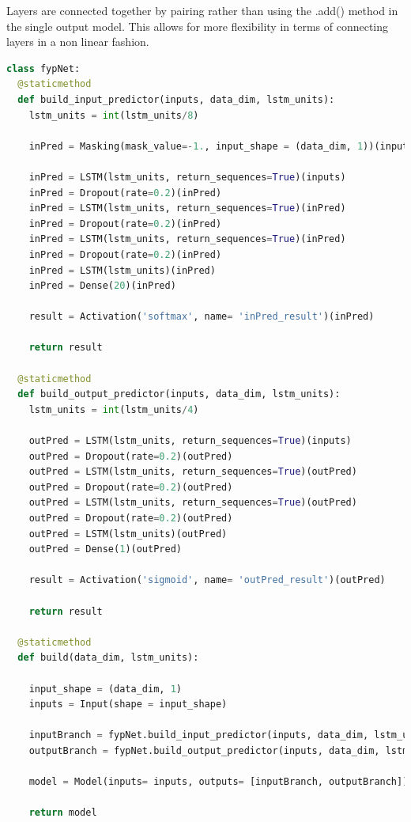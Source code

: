 \documentclass[10pt,onecolumn,letterpaper]{article}
\begin{document}
Layers are connected together by pairing rather than using the .add() method in the single output model. This allows for more flexibility in terms of connecting layers in a non linear fashion.   

\begin{lstlisting}[language=Python, breaklines=true, caption={Structuring of the multi output model, with two branches focused on the separate tasks of predicting the target variable, $y$ and the next input vector, $x_{t+1}$.}]
class fypNet: 
  @staticmethod
  def build_input_predictor(inputs, data_dim, lstm_units):
    lstm_units = int(lstm_units/8)

    inPred = Masking(mask_value=-1., input_shape = (data_dim, 1))(inputs)
    
    inPred = LSTM(lstm_units, return_sequences=True)(inputs)
    inPred = Dropout(rate=0.2)(inPred)
    inPred = LSTM(lstm_units, return_sequences=True)(inPred)
    inPred = Dropout(rate=0.2)(inPred)
    inPred = LSTM(lstm_units, return_sequences=True)(inPred)
    inPred = Dropout(rate=0.2)(inPred)
    inPred = LSTM(lstm_units)(inPred)    
    inPred = Dense(20)(inPred)
    
    result = Activation('softmax', name= 'inPred_result')(inPred)
    
    return result
    
  @staticmethod
  def build_output_predictor(inputs, data_dim, lstm_units): 
    lstm_units = int(lstm_units/4)
    
    outPred = LSTM(lstm_units, return_sequences=True)(inputs)
    outPred = Dropout(rate=0.2)(outPred)
    outPred = LSTM(lstm_units, return_sequences=True)(outPred)
    outPred = Dropout(rate=0.2)(outPred)
    outPred = LSTM(lstm_units, return_sequences=True)(outPred)
    outPred = Dropout(rate=0.2)(outPred)
    outPred = LSTM(lstm_units)(outPred)    
    outPred = Dense(1)(outPred)
    
    result = Activation('sigmoid', name= 'outPred_result')(outPred)
   
    return result
  
  @staticmethod
  def build(data_dim, lstm_units):
         
    input_shape = (data_dim, 1)
    inputs = Input(shape = input_shape)
   
    inputBranch = fypNet.build_input_predictor(inputs, data_dim, lstm_units)
    outputBranch = fypNet.build_output_predictor(inputs, data_dim, lstm_units)
    
    model = Model(inputs= inputs, outputs= [inputBranch, outputBranch])
    
    return model
\end{lstlisting} 
 
\end{document}
